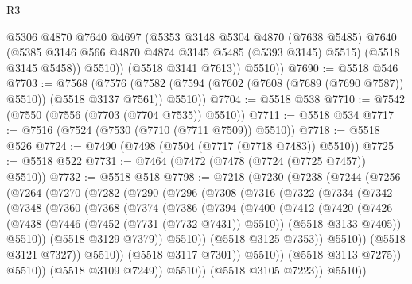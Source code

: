 \begin{lexlean}{R3}
\begin{coremodule}
              @5306
              @4870
              @7640
              @4697
              (@5353
                @3148
                @5304
                @4870
                (@7638 @5485)
                @7640
                (@5385 @3146 @566 @4870 @4874 @3145 @5485 (@5393 @3145) @5515)
                (@5518 @3145 @5458))
              @5510))
          (@5518 @3141 @7613))
        @5510))
@7690 := @5518 @546
@7703 := @7568
    (@7576 (@7582 (@7594 (@7602 (@7608 (@7689 (@7690 @7587)) @5510)) (@5518 @3137 @7561)) @5510))
@7704 := @5518 @538
@7710 := @7542 (@7550 (@7556 (@7703 (@7704 @7535)) @5510))
@7711 := @5518 @534
@7717 := @7516 (@7524 (@7530 (@7710 (@7711 @7509)) @5510))
@7718 := @5518 @526
@7724 := @7490 (@7498 (@7504 (@7717 (@7718 @7483)) @5510))
@7725 := @5518 @522
@7731 := @7464 (@7472 (@7478 (@7724 (@7725 @7457)) @5510))
@7732 := @5518 @518
@7798 := @7218
    (@7230
      (@7238
        (@7244
          (@7256
            (@7264
              (@7270
                (@7282
                  (@7290
                    (@7296
                      (@7308
                        (@7316
                          (@7322
                            (@7334
                              (@7342
                                (@7348
                                  (@7360
                                    (@7368
                                      (@7374
                                        (@7386
                                          (@7394
                                            (@7400
                                              (@7412
                                                (@7420
                                                  (@7426
                                                    (@7438
                                                      (@7446 (@7452 (@7731 (@7732 @7431)) @5510))
                                                      (@5518 @3133 @7405))
                                                    @5510))
                                                (@5518 @3129 @7379))
                                              @5510))
                                          (@5518 @3125 @7353))
                                        @5510))
                                    (@5518 @3121 @7327))
                                  @5510))
                              (@5518 @3117 @7301))
                            @5510))
                        (@5518 @3113 @7275))
                      @5510))
                  (@5518 @3109 @7249))
                @5510))
            (@5518 @3105 @7223))
          @5510))

\end{coremodule}
\end{lexlean}
